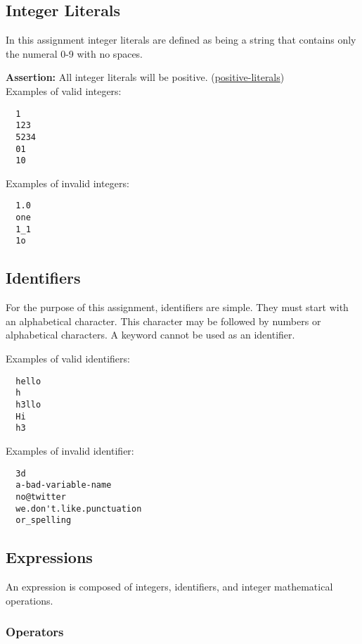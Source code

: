 \documentclass{article}
\newcommand{\assertion}[2]{\textbf{Assertion: }#1 (\hyperlink{#2}{#2})}
\begin{document}
\subsection {Integer Literals}
In this assignment integer literals are defined as being a string that contains only the numeral 0-9 with no spaces.

\assertion{All integer literals will be positive.}{positive-literals}\\

Examples of valid integers:
\begin{lstlisting}
  1
  123
  5234
  01
  10
\end{lstlisting}

Examples of invalid integers:
\begin{lstlisting}
  1.0
  one
  1_1
  1o
\end{lstlisting}

\subsection{Identifiers}
For the purpose of this assignment, identifiers are simple. They must start with an alphabetical
character. This character may be followed by numbers or alphabetical characters. A keyword cannot
be used as an identifier.

Examples of valid identifiers:
\begin{lstlisting}
  hello
  h
  h3llo
  Hi
  h3
\end{lstlisting}

Examples of invalid identifier:
\begin{lstlisting}
  3d
  a-bad-variable-name
  no@twitter
  we.don't.like.punctuation
  or_spelling
\end{lstlisting}

\subsection{Expressions}
An expression is composed of integers, identifiers, and integer mathematical operations.

\subsubsection{Operators}
\end{document}
